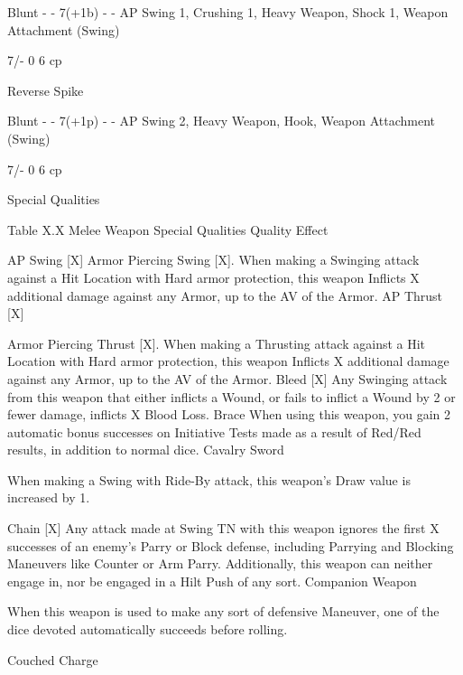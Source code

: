 \documentclass[oneside,11pt,english]{book}
\begin{document}
Blunt - - 7(+1b) - - AP Swing 1, Crushing 1, 
Heavy Weapon, Shock 1, 
Weapon Attachment (Swing) 

7/- 0 6 cp 

Reverse 
Spike 

Blunt - - 7(+1p) - - AP Swing 2, Heavy Weapon, 
Hook, Weapon Attachment 
(Swing) 

7/- 0 6 cp 

 

Special Qualities 

 
Table X.X Melee Weapon Special Qualities 
Quality Effect 


AP Swing [X] Armor Piercing Swing [X]. When making a Swinging attack against a Hit Location with Hard 
armor protection, this weapon Inflicts X additional damage against any Armor, up to the AV of the 
Armor. 
AP Thrust 
[X] 

Armor Piercing Thrust [X]. When making a Thrusting attack against a Hit Location with Hard 
armor protection, this weapon Inflicts X additional damage against any Armor, up to the AV of the 
Armor. 
Bleed [X] Any Swinging attack from this weapon that either inflicts a Wound, or fails to inflict a Wound by 2 
or fewer damage, inflicts X Blood Loss. 
Brace When using this weapon, you gain 2 automatic bonus successes on Initiative Tests made as a result 
of Red/Red results, in addition to normal dice. 
Cavalry 
Sword 

When making a Swing with Ride-By attack, this weapon’s Draw value is increased by 1. 

Chain [X] Any attack made at Swing TN with this weapon ignores the first X successes of an enemy’s Parry 
or Block defense, including Parrying and Blocking Maneuvers like Counter or Arm Parry. 
Additionally, this weapon can neither engage in, nor be engaged in a Hilt Push of any sort. 
Companion 
Weapon 

When this weapon is used to make any sort of defensive Maneuver, one of the dice devoted 
automatically succeeds before rolling. 

Couched 
Charge 
\end{document}
